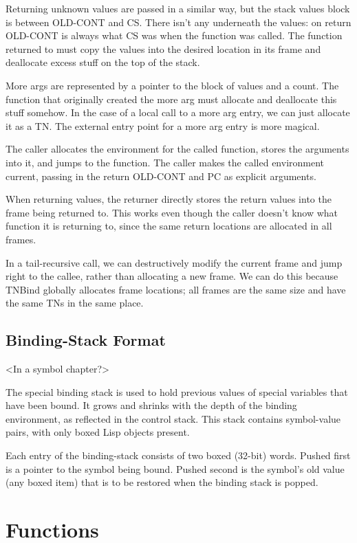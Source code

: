 {\begin{itemize, spread 0, spacing 1}
Returning unknown values are passed in a similar way, but the stack values
block is between OLD-CONT and CS.  There isn't any underneath the values: on
return OLD-CONT is always what CS was when the function was called.  The
function returned to must copy the values into the desired location in its
frame and deallocate excess stuff on the top of the stack.

More args are represented by a pointer to the block of values and a count.  The
function that originally created the more arg must allocate and deallocate this
stuff somehow.  In the case of a local call to a more arg entry, we can just
allocate it as a TN.  The external entry point for a more arg entry is more
magical.



The caller allocates the environment for the called function, stores the
arguments into it, and jumps to the function.  The caller makes the called
environment current, passing in the return OLD-CONT and PC as explicit arguments.

When returning values, the returner directly stores the return values into the
frame being returned to.  This works even though the caller doesn't know what
function it is returning to, since the same return locations are allocated in
all frames.

In a tail-recursive call, we can destructively modify the current frame and
jump right to the callee, rather than allocating a new frame.  We can do this
because TNBind globally allocates frame locations; all frames are the same size
and have the same TNs in the same place.

\section{Binding-Stack Format}
\comment<In a symbol chapter?>


The special binding stack is used to hold previous values of special variables
that have been bound.  It grows and shrinks with the depth of the binding
environment, as reflected in the control stack. This stack contains
symbol-value pairs, with only boxed Lisp objects present.

Each entry of the binding-stack consists of two boxed (32-bit) words.  Pushed
first is a pointer to the symbol being bound.  Pushed second is the symbol's
old value (any boxed item) that is to be restored when the binding stack is
popped.

\chapter{Functions}


\end{itemize, spread 0, spacing 1}}
